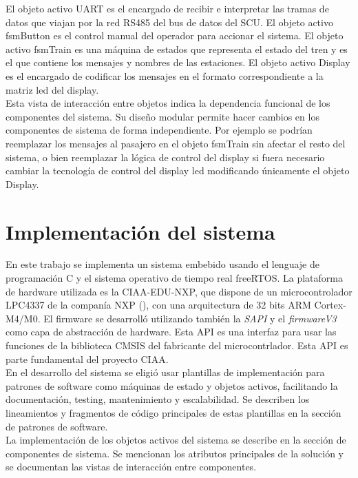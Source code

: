 El objeto activo UART es el encargado de recibir e interpretar las tramas de datos que viajan por la red RS485 del bus de datos del SCU. El objeto activo fsmButton es el control manual del operador para accionar el sistema. El objeto activo fsmTrain es una máquina de estados que representa el estado del tren y es el que contiene los mensajes y nombres de las estaciones. El objeto activo Display es el encargado de codificar los mensajes en el formato correspondiente a la matriz led del display.\\

Esta vista de interacción entre objetos indica la dependencia funcional de los componentes del sistema. Su diseño modular permite hacer cambios en los componentes de sistema de forma independiente. Por ejemplo se podrían reemplazar los mensajes al pasajero en el objeto fsmTrain sin afectar el resto del sistema, o bien reemplazar la lógica de control del display si fuera necesario cambiar la tecnología de control del display led modificando únicamente el objeto Display.\\


\section{Implementación del sistema}
En este trabajo se implementa un sistema embebido usando el lenguaje de programación C y el sistema operativo de tiempo real freeRTOS. La plataforma de hardware utilizada es la CIAA-EDU-NXP, que dispone de un microcontrolador LPC4337 de la companía NXP (\cite{NXPLPC4337}), con una arquitectura de 32 bits ARM Cortex-M4/M0. El firmware se desarrolló utilizando también la \textit{SAPI} y el \textit{firmwareV3} \cite{firmwarev3} como capa de abstracción de hardware. Esta API es una interfaz para usar las funciones de la biblioteca CMSIS del fabricante del microcontrlador. Esta API es parte fundamental del proyecto CIAA.\\
 
En el desarrollo del sistema se eligió usar plantillas de implementación para patrones de software como máquinas de estado y objetos activos, facilitando la documentación, testing, mantenimiento y escalabilidad. Se describen los lineamientos y fragmentos de código principales de estas plantillas en la sección de patrones de software. \\

La implementación de los objetos activos del sistema se describe en la sección de componentes de sistema. Se mencionan los atributos principales de la solución y se documentan las vistas de interacción entre componentes.\\

